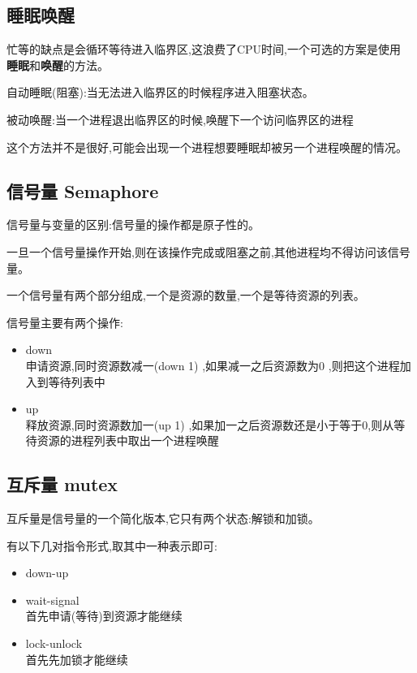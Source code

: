 \documentclass[UTF8,a4paper]{ctexart}
\begin{document}
\subsection{睡眠唤醒}

忙等的缺点是会循环等待进入临界区,这浪费了CPU时间,一个可选的方案是使用 \textbf{睡眠}和\textbf{唤醒}的方法。

自动睡眠(阻塞):当无法进入临界区的时候程序进入阻塞状态。

被动唤醒:当一个进程退出临界区的时候,唤醒下一个访问临界区的进程

这个方法并不是很好,可能会出现一个进程想要睡眠却被另一个进程唤醒的情况。

\subsection{信号量 Semaphore}
信号量与变量的区别:信号量的操作都是原子性的。

一旦一个信号量操作开始,则在该操作完成或阻塞之前,其他进程均不得访问该信号量。

一个信号量有两个部分组成,一个是资源的数量,一个是等待资源的列表。

信号量主要有两个操作:
\begin{itemize}
	\item down\\
	      申请资源,同时资源数减一(down 1) ,如果减一之后资源数为0 ,则把这个进程加入到等待列表中
	\item up\\
	      释放资源,同时资源数加一(up 1) ,如果加一之后资源数还是小于等于0,则从等待资源的进程列表中取出一个进程唤醒
\end{itemize}

\subsection{互斥量 mutex}
互斥量是信号量的一个简化版本,它只有两个状态:解锁和加锁。

有以下几对指令形式,取其中一种表示即可:
\begin{itemize}
	\item down-up
	\item wait-signal\\
	      首先申请(等待)到资源才能继续
	\item lock-unlock\\
	      首先先加锁才能继续
\end{itemize}
\end{document}
